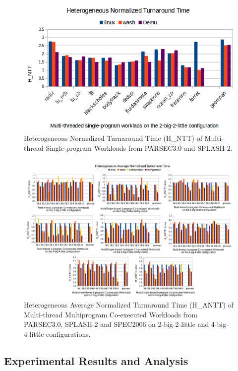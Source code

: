 \documentclass[sigplan,review,anonymous]{acmart}\settopmatter{printfolios=true,printccs=false,printacmref=false}
\begin{document}
\begin{figure}
\centering
\includegraphics[scale=0.4]{figures/MSW.png}
\caption{Heterogeneous Normalized Turnaround Time (H\_NTT) of Multi-thread Single-program Workloads from PARSEC3.0 and SPLASH-2.}
\label{MSW}
\end{figure}  
\begin{figure}
\centering
\includegraphics[scale=0.5]{figures/HANTT.png}
\caption{Heterogeneous Average Normalized Turnaround Time (H\_ANTT)  of Multi-thread Multiprogram Co-executed Workloads from PARSEC3.0, SPLASH-2 and SPEC2006 on 2-big-2-little and 4-big-4-little configurations.}
\label{M24W}
\end{figure}

\subsection{Experimental Results and Analysis}
\end{document}
